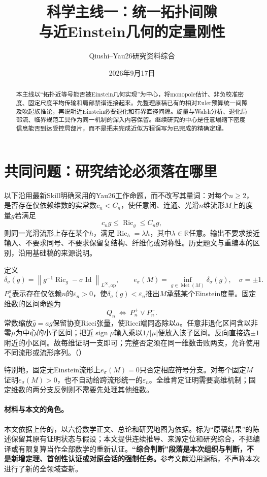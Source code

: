 \documentclass[UTF8,fontset=fandol,zihao=-4]{ctexart}
\title{科学主线一：统一拓扑间隙\\[2mm]与近Einstein几何的定量刚性}
\author{Qiushi--Yau26研究资料综合}
\date{2026年9月17日}
\theoremstyle{research}
\DeclareMathOperator{\Ric}{Ric}
\DeclareMathOperator{\Id}{Id}
\DeclareMathOperator{\Met}{Met}
\newcommand{\R}{\mathbb R}
\newcommand{\op}{\mathrm{op}}
\newcommand{\norm}[1]{\left\|#1\right\|}
\numberwithin{equation}{section}
\begin{document}
\maketitle
\begin{abstract}
本主线以“拓扑近等号能否被Einstein几何实现”为中心，将monopole估计、非负校准密度、固定尺度平均传输和局部禁谱连接起来。先整理原稿已有的相对Euler预算统一间隙及吹起族推论，再说明近Einstein必要退化和有界直径间隙。旋量与Walsh分析、退化局部流、临界规范工具作为同一机制的深入内容保留。继续研究的中心是任意塌缩下密度信息能否到达受控局部片，而不是把未完成近似方程误写为已完成的精确定理。
\end{abstract}
\tableofcontents
\clearpage

\section{共同问题：研究结论必须落在哪里}
以下沿用最新Skill明确采用的Yau26工作命题，而不改写其量词：对每个$n\ge2$，是否存在仅依赖维数的实常数$c_n<C_n$，使任意闭、连通、光滑$n$维流形$M$上的度量$g$若满足
\[
c_ng\le\Ric_g\le C_ng,
\]
则同一光滑流形上存在某个$h$，满足$\Ric_h=\lambda h$，其中$\lambda\in\R$任意。输出不要求接近输入、不要求同号、不要求保留复结构、纤维化或对称性。历史题文与重编本的区别，沿用基础稿的来源说明\cite{F,Overview}。

定义
\[
\delta_\sigma(g)=\norm{g^{-1}\Ric_g-\sigma\Id}_{L^\infty,\op},\qquad
e_\sigma(M)=\inf_{g\in\Met(M)}\delta_\sigma(g),\quad\sigma=\pm1.
\]
$P_n^\sigma$表示存在仅依赖$n$的$\varepsilon_n>0$，使$\delta_\sigma(g)<\varepsilon_n$推出$M$承载某个Einstein度量。固定维数的区间命题为
\[
Q_n\ \Longleftrightarrow\ P_n^+\lor P_n^-.
\]
常数缩放$\widehat g=ag$保留协变Ricci张量，使Ricci端同态除以$a$。任意非退化区间含以非零$\mu$为中心的小子区间；把近$\operatorname{sign}\mu$输入乘以$1/|\mu|$便放入该子区间。反向直接选$\pm1$附近的小区间。故每维证明一支即可；完整否定须在同一维数击败两支，允许使用不同流形或流形序列。\cite{F}（）

特别地，固定无Einstein流形上$e_\sigma(M)=0$只否定相应符号分支。对每个固定$M$证明$e_\sigma(M)>0$，也不自动给跨流形统一的$\varepsilon_n$。全维肯定证明需要高维机制；固定维数的两分支反例则不需要先处理其他维数。

\paragraph{材料与本文的角色。}
本文依据上传的，以六份数学正文、总论和研究地图为依据。标为“原稿结果”的陈述保留其原有证明状态与假设；本文提供连续推导、来源定位和研究综合，不把编译或有限复算当作全部数学的重新认证。\textbf{“综合判断”段落是本次组织与判断，不是新增定理、首创性认证或对原会话的强制任务。}参考文献沿用源稿，不声称本次进行了新的全领域查新。
\end{document}
